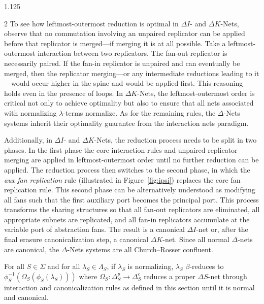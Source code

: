\documentclass[10pt]{article}
\begin{document}
\begin{spacing}{1.125}
\begin{multicols}{2}
To see how leftmost-outermost reduction is optimal in \mbox{$\Delta I$-} and \mbox{$\Delta K$-Nets}, observe that no commutation involving an unpaired replicator can be applied before that replicator is merged---if merging it is at all possible. Take a leftmost-outermost interaction between two replicators. The fan-out replicator is necessarily paired.
If the fan-in replicator is unpaired and can eventually be merged, then the replicator merging---or any intermediate reductions leading to it---would occur higher in the spine and would be applied first.
This reasoning holds even in the presence of loops.
In \mbox{$\Delta K$-Nets}, the leftmost-outermost order is critical not only to achieve optimality but also to ensure that all nets associated with normalizing \mbox{$\lambda$-terms} normalize.
As for the remaining rules, the \mbox{$\Delta$-Nets} systems inherit their optimality guarantee from the interaction nets paradigm.

Additionally, in \mbox{$\Delta I$-} and \mbox{$\Delta K$-Nets}, the reduction process needs to be split in two phases. In the first phase the core interaction rules and unpaired replicator merging are applied in leftmost-outermost order until no further reduction can be applied. The reduction process then switches to the second phase, in which the \emph{aux fan replication} rule (illustrated in \mbox{Figure \ref{fig:ipsi}}) replaces the core fan replication rule.
This second phase can be alternatively understood as modifying all fans such that the first auxiliary port becomes the principal port. This process transforms the sharing structures so that all fan-out replicators are eliminated, all appropriate subnets are replicated, and all fan-in replicators accumulate at the variable port of abstraction fans.
The result is a canonical \mbox{$\Delta I$-net} or, after the final erasure canonicalization step, a canonical \mbox{$\Delta K$-net}.
Since all normal \mbox{$\Delta$-nets} are canonical, the \mbox{$\Delta$-Nets} systems are all Church--Rosser confluent.

\vspace{0.3cm}
\begin{definition}
For all \mbox{$S \in \Sigma$} and for all \mbox{$\lambda_S \in \Lambda_S$}, if $\lambda_S$ is normalizing, \mbox{$\lambda_S$} \mbox{$\beta$-reduces} to \mbox{$\phi_S^{-1}(\Omega_S(\phi_S(\lambda_S)))$} where \mbox{$\Omega_S : \Delta_S^p \rightarrow \Delta_S^{c}$} reduces a proper \mbox{$\Delta S$-net} through interaction and canonicalization rules as defined in this section until it is normal and canonical.
\end{definition}


\end{multicols}
\end{spacing}
\end{document}
